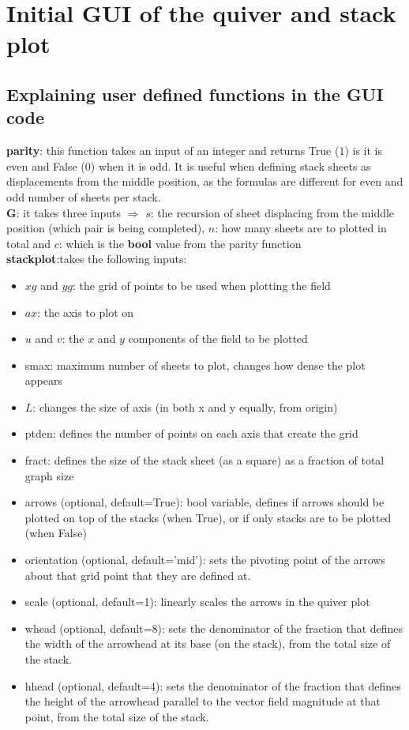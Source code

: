 \documentclass[11]{report}
\begin{document}
\section{Initial GUI of the quiver and stack plot}

\subsection{Explaining user defined functions in the GUI code}

\textbf{parity}: this function takes an input of an integer and returns True ($1$) is it is even and False ($0$) when it is odd. It is useful when defining stack sheets as displacements from the middle position, as the formulas are different for even and odd number of sheets per stack.\\
\textbf{G}: it takes three inputs $\Rightarrow$ $s$: the recursion of sheet displacing from the middle position (which pair is being completed), $n$: how many sheets are to plotted in total and $c$: which is the \textbf{bool} value from the parity function\\
\textbf{stack\textunderscore plot}:takes the following inputs:
\begin{itemize}
	\item $xg$ and $yg$: the grid of points to be used when plotting the field
	\item $ax$: the axis to plot on
	\item $u$ and $v$: the $x$ and $y$ components of the field to be plotted
	\item s\textunderscore max: maximum number of sheets to plot, changes how dense the plot appears
	\item $L$: changes the size of axis (in both x and y equally, from origin)
	\item pt\textunderscore den: defines the number of points on each axis that create the grid
	\item fract: defines the size of the stack sheet (as a square) as a fraction of total graph size
	\item arrows (optional, default=True): bool variable, defines if arrows should be plotted on top of the stacks (when True), or if only stacks are to be plotted (when False)
	\item orientation (optional, default='mid'): sets the pivoting point of the arrows about that grid point that they are defined at.
	\item scale (optional, default=1): linearly scales the arrows in the quiver plot
	\item w\textunderscore head (optional, default=8): sets the denominator of the fraction that defines the width of the arrowhead at its base (on the stack), from the total size of the stack.
	\item h\textunderscore head (optional, default=4): sets the denominator of the fraction that defines the height of the arrowhead parallel to the vector field magnitude at that point, from the total size of the stack.
\end{itemize}
\end{document}
